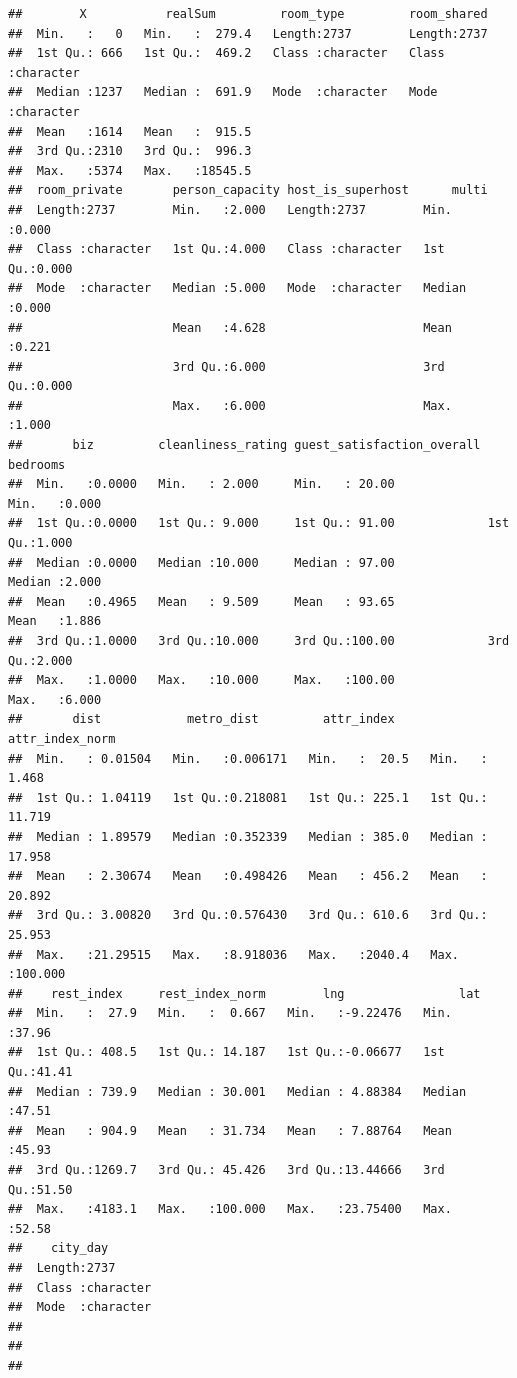 \documentclass[
]{article}
\begin{document}
\begin{verbatim}
##        X           realSum         room_type         room_shared       
##  Min.   :   0   Min.   :  279.4   Length:2737        Length:2737       
##  1st Qu.: 666   1st Qu.:  469.2   Class :character   Class :character  
##  Median :1237   Median :  691.9   Mode  :character   Mode  :character  
##  Mean   :1614   Mean   :  915.5                                        
##  3rd Qu.:2310   3rd Qu.:  996.3                                        
##  Max.   :5374   Max.   :18545.5                                        
##  room_private       person_capacity host_is_superhost      multi      
##  Length:2737        Min.   :2.000   Length:2737        Min.   :0.000  
##  Class :character   1st Qu.:4.000   Class :character   1st Qu.:0.000  
##  Mode  :character   Median :5.000   Mode  :character   Median :0.000  
##                     Mean   :4.628                      Mean   :0.221  
##                     3rd Qu.:6.000                      3rd Qu.:0.000  
##                     Max.   :6.000                      Max.   :1.000  
##       biz         cleanliness_rating guest_satisfaction_overall    bedrooms    
##  Min.   :0.0000   Min.   : 2.000     Min.   : 20.00             Min.   :0.000  
##  1st Qu.:0.0000   1st Qu.: 9.000     1st Qu.: 91.00             1st Qu.:1.000  
##  Median :0.0000   Median :10.000     Median : 97.00             Median :2.000  
##  Mean   :0.4965   Mean   : 9.509     Mean   : 93.65             Mean   :1.886  
##  3rd Qu.:1.0000   3rd Qu.:10.000     3rd Qu.:100.00             3rd Qu.:2.000  
##  Max.   :1.0000   Max.   :10.000     Max.   :100.00             Max.   :6.000  
##       dist            metro_dist         attr_index     attr_index_norm  
##  Min.   : 0.01504   Min.   :0.006171   Min.   :  20.5   Min.   :  1.468  
##  1st Qu.: 1.04119   1st Qu.:0.218081   1st Qu.: 225.1   1st Qu.: 11.719  
##  Median : 1.89579   Median :0.352339   Median : 385.0   Median : 17.958  
##  Mean   : 2.30674   Mean   :0.498426   Mean   : 456.2   Mean   : 20.892  
##  3rd Qu.: 3.00820   3rd Qu.:0.576430   3rd Qu.: 610.6   3rd Qu.: 25.953  
##  Max.   :21.29515   Max.   :8.918036   Max.   :2040.4   Max.   :100.000  
##    rest_index     rest_index_norm        lng                lat       
##  Min.   :  27.9   Min.   :  0.667   Min.   :-9.22476   Min.   :37.96  
##  1st Qu.: 408.5   1st Qu.: 14.187   1st Qu.:-0.06677   1st Qu.:41.41  
##  Median : 739.9   Median : 30.001   Median : 4.88384   Median :47.51  
##  Mean   : 904.9   Mean   : 31.734   Mean   : 7.88764   Mean   :45.93  
##  3rd Qu.:1269.7   3rd Qu.: 45.426   3rd Qu.:13.44666   3rd Qu.:51.50  
##  Max.   :4183.1   Max.   :100.000   Max.   :23.75400   Max.   :52.58  
##    city_day        
##  Length:2737       
##  Class :character  
##  Mode  :character  
##                    
##                    
## 
\end{verbatim}
\end{document}

